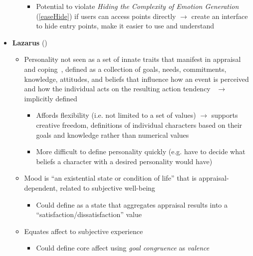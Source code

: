 \begin{itemize}
\begin{itemize}
\begin{itemize}
            \item Potential to violate \textit{Hiding the Complexity of Emotion
                Generation} (\ref{easeHide}) if users can access points directly
            $\rightarrow$ create an interface to hide entry points, make it
            easier to use and understand
        \end{itemize}
    \end{itemize}

    \item \textbf{Lazarus} (\weak)
    \begin{itemize}
        \item Personality not seen as a set of innate traits that manifest in
        appraisal and coping~\citep[p.~316]{lazarus1991emotion}, defined as a
        collection of goals, needs, commitments, knowledge, attitudes, and
        beliefs that influence how an event is perceived and how the individual
        acts on the resulting action tendency~\citep[p.~623--624,
        628]{smith1990emotion} $\rightarrow$ implicitly defined
        \begin{itemize}
            \item  Affords flexibility (i.e. not limited to a set of values)
            $\rightarrow$ supports creative freedom, definitions of individual
            characters based on their goals and knowledge rather than numerical
            values

            \item More difficult to define personality quickly (e.g. have to
            decide what beliefs a character with a desired personality would
            have)
        \end{itemize}

        \item Mood is ``an existential state or condition of life'' that is
        appraisal-dependent, related to subjective
        well-being~\citep[p.~266--267]{lazarus1991emotion}
        \begin{itemize}
            \item Could define as a state that aggregates appraisal results
            into a ``satisfaction/dissatisfaction'' value
        \end{itemize}

        \item Equates affect to subjective
        experience~\citep[p.~57]{lazarus1991emotion}
        \begin{itemize}
            \item Could define core affect using \textit{goal congruence} as
            \textit{valence}


\end{itemize}
\end{itemize}
\end{itemize}
